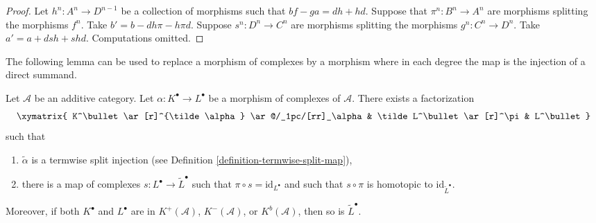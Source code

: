 \begin{proof}
Let $h^n : A^n \to D^{n - 1}$ be a collection of morphisms
such that $bf - ga = dh + hd$. Suppose that $\pi^n : B^n \to A^n$
are morphisms splitting the morphisms $f^n$.
Take $b' = b - dh\pi - h\pi d$.
Suppose $s^n : D^n \to C^n$ are morphisms splitting the morphisms
$g^n : C^n \to D^n$. Take $a' = a + dsh + shd$.
Computations omitted.
\end{proof}

\noindent
The following lemma can be used to replace a morphism of complexes
by a morphism where in each degree the map is the injection of a
direct summand.

\begin{lemma}
\label{lemma-make-injective}
Let $\mathcal{A}$ be an additive category.
Let $\alpha : K^\bullet \to L^\bullet$ be a morphism
of complexes of $\mathcal{A}$.
There exists a factorization
$$
\xymatrix{
K^\bullet \ar[r]^{\tilde \alpha} \ar@/_1pc/[rr]_\alpha &
\tilde L^\bullet \ar[r]^\pi &
L^\bullet
}
$$
such that
\begin{enumerate}
\item $\tilde \alpha$ is a termwise split injection (see
Definition \ref{definition-termwise-split-map}),
\item there is a map of complexes $s : L^\bullet \to \tilde L^\bullet$
such that $\pi \circ s = \text{id}_{L^\bullet}$ and such that
$s \circ \pi$ is homotopic to $\text{id}_{\tilde L^\bullet}$.
\end{enumerate}
Moreover, if both $K^\bullet$ and $L^\bullet$ are in
$K^{+}(\mathcal{A})$, $K^{-}(\mathcal{A})$, or $K^b(\mathcal{A})$,
then so is $\tilde L^\bullet$.
\end{lemma}

